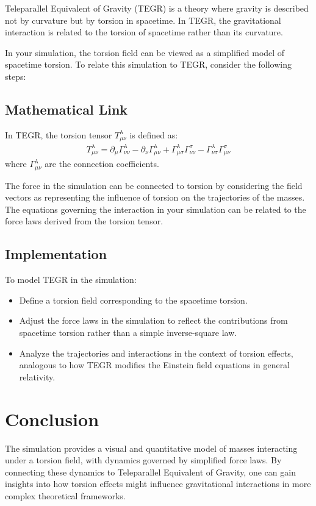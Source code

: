 \documentclass{article}
\begin{document}
Teleparallel Equivalent of Gravity (TEGR) is a theory where gravity is described not by curvature but by torsion in spacetime. In TEGR, the gravitational interaction is related to the torsion of spacetime rather than its curvature. 

In your simulation, the torsion field can be viewed as a simplified model of spacetime torsion. To relate this simulation to TEGR, consider the following steps:

\subsection{Mathematical Link}
In TEGR, the torsion tensor \( T^\lambda_{\mu\nu} \) is defined as:
\begin{align}
T^\lambda_{\mu\nu} = \partial_\mu \Gamma^\lambda_{\nu\nu} - \partial_\nu \Gamma^\lambda_{\mu\nu} + \Gamma^\lambda_{\mu\sigma} \Gamma^\sigma_{\nu\nu} - \Gamma^\lambda_{\nu\sigma} \Gamma^\sigma_{\mu\nu}
\end{align}
where \( \Gamma^\lambda_{\mu\nu} \) are the connection coefficients.

The force in the simulation can be connected to torsion by considering the field vectors as representing the influence of torsion on the trajectories of the masses. The equations governing the interaction in your simulation can be related to the force laws derived from the torsion tensor.

\subsection{Implementation}
To model TEGR in the simulation:
\begin{itemize}
    \item Define a torsion field corresponding to the spacetime torsion.
    \item Adjust the force laws in the simulation to reflect the contributions from spacetime torsion rather than a simple inverse-square law.
    \item Analyze the trajectories and interactions in the context of torsion effects, analogous to how TEGR modifies the Einstein field equations in general relativity.
\end{itemize}

\section{Conclusion}
The simulation provides a visual and quantitative model of masses interacting under a torsion field, with dynamics governed by simplified force laws. By connecting these dynamics to Teleparallel Equivalent of Gravity, one can gain insights into how torsion effects might influence gravitational interactions in more complex theoretical frameworks.
\end{document}

